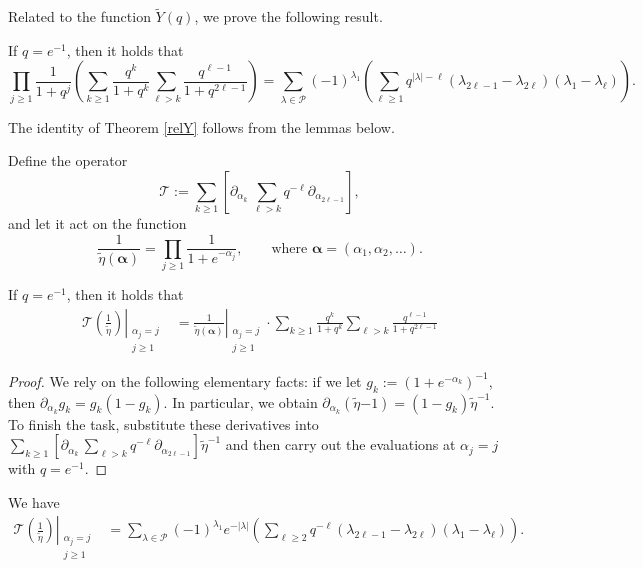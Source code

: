 \documentclass[a4paper,reqno,12pt]{amsart}
\begin{document}
Related to the function $\widetilde Y(q)$, we prove the following result.



\begin{theorem} \label{relY} If $q=e^{-1}$, then it holds that 
$$\prod_{j\geq1} \frac1{1+q^j} \left(\sum_{k\geq1} \frac{q^k}{1+q^k} \sum_{\ell>k} \frac{q^{\ell-1}}{1+q^{2\ell-1}}\right)
= \sum_{\lambda\in \mathcal{P}}  (-1)^{\lambda_1} 
 \left( \sum_{\ell\geq1} q^{\vert\lambda\vert-\ell} (\lambda_{2\ell-1}-\lambda_{2\ell})(\lambda_1-\lambda_{\ell}) \right).$$
\end{theorem}

The identity of Theorem \ref{relY} follows from the lemmas below. 

Define the operator 
$$\mathcal{T}:=\sum_{k\geq1} \left[  \partial_{\alpha_k}\, \sum_{\ell>k}q^{-\ell} \partial_{\alpha_{2\ell-1}}\right],$$ 
and let it act on  the function 
$$\frac1{\widetilde{\eta}(\pmb{\alpha})} =\prod_{j\geq1} \frac1{1+e^{-\alpha_j}}, \qquad \text{where $\pmb{\alpha}=(\alpha_1,\alpha_2,\dots)$}. $$

\begin{lemma} \label{altlemma3} If $q=e^{-1}$, then it holds that
\begin{align*}   \left. \mathcal{T} \left(\frac1{\widetilde{\eta}}\right) \right\vert_{\substack{\alpha_j=j\\ j\geq1}}
& = \left.\frac1{\widetilde{\eta}(\pmb{\alpha})} \right\vert_{\substack{\alpha_j=j\\ j\geq1}}\cdot 
\sum_{k\geq1} \frac{q^k}{1+q^k} \sum_{\ell>k} \frac{q^{\ell-1}}{1+q^{2\ell-1}}
\end{align*}
\end{lemma}

\begin{proof} We rely on the following elementary facts: if we let $g_k:=(1+e^{-\alpha_k})^{-1}$, then $\partial_{\alpha_k}g_k=g_k(1-g_k)$.   
In particular, we obtain $\partial_{\alpha_k}(\widetilde{\eta}{-1})=(1-g_k) \widetilde{\eta}^{-1}$.
To finish the task, substitute these derivatives into $\sum_{k\geq1} \left[\partial_{\alpha_k}\, \sum_{\ell>k}q^{-\ell} \partial_{\alpha_{2\ell-1}}\right]\widetilde{\eta}^{-1}$ and then carry out the evaluations at $\alpha_j=j$ with $q=e^{-1}$.
\end{proof}


\begin{lemma} \label{altlemma4}  We have
\begin{align*}   
\left. \mathcal{T} \left(\frac1{\widetilde{\eta}}\right) \right\vert_{\substack{\alpha_j=j \\ j\geq1}}
& = \sum_{\lambda\in \mathcal{P}} (-1)^{\lambda_1} e^{-\vert\lambda\vert} 
 \left( \sum_{\ell\geq2} q^{-\ell} (\lambda_{2\ell-1}-\lambda_{2\ell})(\lambda_1-\lambda_{\ell}) \right).
\end{align*}
\end{lemma}
\end{document}
